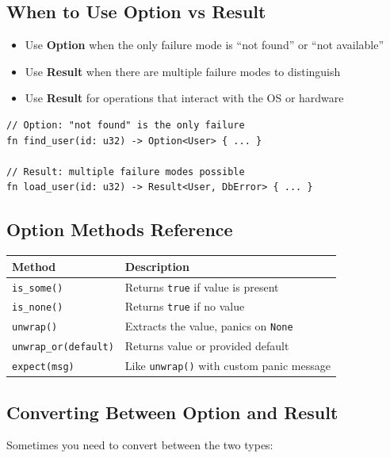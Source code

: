 \subsection{When to Use Option vs Result}

\begin{itemize}
    \item Use \textbf{Option} when the only failure mode is ``not found'' or ``not available''
    \item Use \textbf{Result} when there are multiple failure modes to distinguish
    \item Use \textbf{Result} for operations that interact with the OS or hardware
\end{itemize}

\begin{lstlisting}
// Option: "not found" is the only failure
fn find_user(id: u32) -> Option<User> { ... }

// Result: multiple failure modes possible
fn load_user(id: u32) -> Result<User, DbError> { ... }
\end{lstlisting}

\subsection{Option Methods Reference}

\begin{center}
\begin{tabular}{lp{8cm}}
\textbf{Method} & \textbf{Description} \\
\hline
\texttt{is\_some()} & Returns \texttt{true} if value is present \\
\texttt{is\_none()} & Returns \texttt{true} if no value \\
\texttt{unwrap()} & Extracts the value, panics on \texttt{None} \\
\texttt{unwrap\_or(default)} & Returns value or provided default \\
\texttt{expect(msg)} & Like \texttt{unwrap()} with custom panic message \\
\end{tabular}
\end{center}

\subsection{Converting Between Option and Result}

Sometimes you need to convert between the two types:

